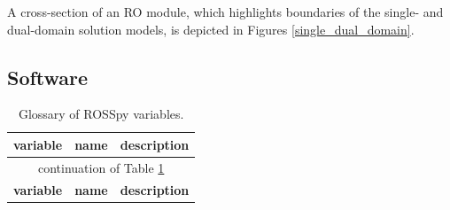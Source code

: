\begin{supplementary}
A cross-section of an RO module, which highlights boundaries of the single- and dual-domain solution models, is depicted in Figures \ref{single_dual_domain}.

\subsection{Software}

\begin{longtable}{c|c|c}
    \caption{
        Glossary of ROSSpy variables.  
        \label{glossary} 
    } \\ \toprule
    
    \textbf{variable} & \textbf{name} & \textbf{description} \\ \toprule
    \endfirsthead
    \multicolumn{3}{c}{continuation of Table \ref{glossary}} \\  \toprule
    \textbf{variable} & \textbf{name} & \textbf{description} \\ \toprule
    \endhead
    

\end{longtable}
\end{supplementary}
